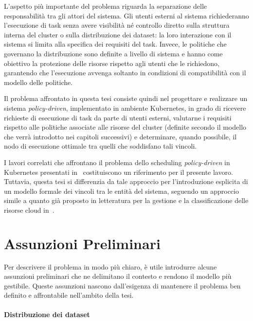 L'aspetto più importante del problema riguarda la separazione delle responsabilità tra gli attori del sistema. Gli utenti esterni al sistema richiederanno l'esecuzione di task senza avere visibilità né controllo diretto sulla struttura interna del cluster o sulla distribuzione dei dataset: la loro interazione con il sistema si limita alla specifica dei requisiti del task. Invece, le politiche che governano la distribuzione sono definite a livello di sistema e hanno come obiettivo la protezione delle risorse rispetto agli utenti che le richiedono, garantendo che l'esecuzione avvenga soltanto in condizioni di compatibilità con il modello delle politiche.

Il problema affrontato in questa tesi consiste quindi nel progettare e realizzare un sistema \emph{policy-driven}, implementato in ambiente Kubernetes, in grado di ricevere richieste di esecuzione di task da parte di utenti esterni, valutarne i requisiti rispetto alle politiche associate alle risorse del cluster (definite secondo il modello che verrà introdotto nei capitoli successivi) e determinare, quando possibile, il nodo di esecuzione ottimale tra quelli che soddisfano tali vincoli. 

I lavori correlati che affrontano il problema dello scheduling \emph{policy-driven} in Kubernetes presentati in~\cite{policy-driven-sec-aware-scheduling-k8s, secure-k8s-workload-deployment} costituiscono un riferimento per il presente lavoro. Tuttavia, questa tesi si differenzia da tale approccio per l'introduzione esplicita di un modello formale dei vincoli tra le entità del sistema, seguendo un approccio simile a quanto già proposto in letteratura per la gestione e la classificazione delle risorse cloud in~\cite{sec-aware-data-alloc-multicloud, supp-sec-req-res-management-cloud, model-decision-data-storage-cloud}.


\section{Assunzioni Preliminari}
\label{sec:assunzioni_preliminari}

Per descrivere il problema in modo più chiaro, è utile introdurre alcune assunzioni preliminari che ne delimitano il contesto e rendono il modello più gestibile. Queste assunzioni nascono dall'esigenza di mantenere il problema ben definito e affrontabile nell'ambito della tesi.

\paragraph{Distribuzione dei dataset}
\label{ass:dataset_distribuzione}

